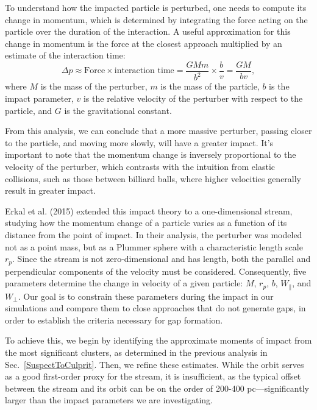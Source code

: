 \documentclass[]{aa}
\begin{document}
    To understand how the impacted particle is perturbed, one needs to compute its change in momentum, which is determined by integrating the force acting on the particle over the duration of the interaction. A useful approximation for this change in momentum is the force at the closest approach multiplied by an estimate of the interaction time:
    \begin{equation} 
      \Delta p \approx \text{Force} \times \text{interaction time} = \frac{GMm}{b^2} \times \frac{b}{v} = \frac{GM}{bv}, 
      \end{equation}
    where $M$ is the mass of the perturber, $m$ is the mass of the particle, $b$ is the impact parameter, $v$ is the relative velocity of the perturber with respect to the particle, and $G$ is the gravitational constant.

    From this analysis, we can conclude that a more massive perturber, passing closer to the particle, and moving more slowly, will have a greater impact. It's important to note that the momentum change is inversely proportional to the velocity of the perturber, which contrasts with the intuition from elastic collisions, such as those between billiard balls, where higher velocities generally result in greater impact.

    Erkal et al. (2015) extended this impact theory to a one-dimensional stream, studying how the momentum change of a particle varies as a function of its distance from the point of impact. In their analysis, the perturber was modeled not as a point mass, but as a Plummer sphere with a characteristic length scale $r_p$. Since the stream is not zero-dimensional and has length, both the parallel and perpendicular components of the velocity must be considered. Consequently, five parameters determine the change in velocity of a given particle: $M$, $r_p$, $b$, $W_\parallel$, and $W_\perp$. Our goal is to constrain these parameters during the impact in our simulations and compare them to close approaches that do not generate gaps, in order to establish the criteria necessary for gap formation.

    To achieve this, we begin by identifying the approximate moments of impact from the most significant clusters, as determined in the previous analysis in Sec.~\ref{SuspectToCulprit}. Then, we refine these estimates. While the orbit serves as a good first-order proxy for the stream, it is insufficient, as the typical offset between the stream and its orbit can be on the order of 200-400 pc—significantly larger than the impact parameters we are investigating.
\end{document}
